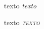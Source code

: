 \documentclass[a4paper,12pt]{article}
\begin{document}
	{texto \slshape\sffamily texto}
	
	{texto \slshape\scshape texto}
	
				
\end{document}
